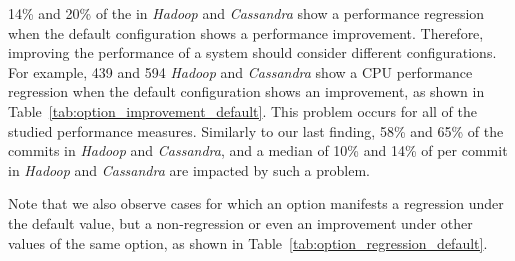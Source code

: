 14\% and 20\% of the \instance in \emph{Hadoop} and \emph{Cassandra} show a performance regression when the default configuration shows a performance improvement. Therefore, improving the performance of a system should consider different configurations. For example, 439 and 594 \emph{Hadoop} and \emph{Cassandra} \instance show a CPU performance regression when the default configuration shows an improvement, as shown in Table~\ref{tab:option_improvement_default}. This problem occurs for all of the studied performance measures. Similarly to our last finding, 58\% and 65\% of the commits in \emph{Hadoop} and \emph{Cassandra}, and a median of 10\% and 14\% of \instance per commit in \emph{Hadoop} and \emph{Cassandra} are impacted by such a problem.

Note that we also observe cases for which an option manifests a regression under the default value, but a non-regression or even an improvement under other values of the same option, as shown in Table~\ref{tab:option_regression_default}.%






